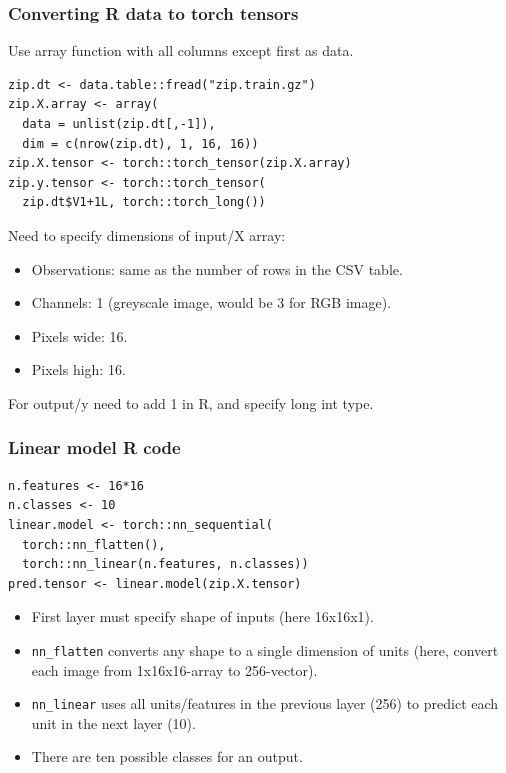 \documentclass{beamer}
\begin{document}
\begin{frame}[fragile]
  \frametitle{Converting R data to torch tensors}
Use array function with all columns except first as data.  
\begin{verbatim}
zip.dt <- data.table::fread("zip.train.gz")
zip.X.array <- array(
  data = unlist(zip.dt[,-1]),
  dim = c(nrow(zip.dt), 1, 16, 16))
zip.X.tensor <- torch::torch_tensor(zip.X.array)
zip.y.tensor <- torch::torch_tensor(
  zip.dt$V1+1L, torch::torch_long())
\end{verbatim}
Need to specify dimensions of input/X array:
\begin{itemize}
\item Observations: same as the number of rows in the CSV table.
\item Channels: 1 (greyscale image, would be 3 for RGB image).
\item Pixels wide: 16.
\item Pixels high: 16.
\end{itemize}

For output/y need to add 1 in R, and specify long int type.

\end{frame}

\begin{frame}[fragile]
  \frametitle{Linear model R code}

\begin{verbatim}
n.features <- 16*16
n.classes <- 10
linear.model <- torch::nn_sequential(
  torch::nn_flatten(),
  torch::nn_linear(n.features, n.classes))
pred.tensor <- linear.model(zip.X.tensor)
\end{verbatim}

  \begin{itemize}
  \item First layer must specify shape of inputs (here 16x16x1).
  \item \texttt{nn\_flatten} converts any shape to a single dimension
    of units (here, convert each image from 1x16x16-array to 256-vector).
  \item \texttt{nn\_linear} uses all units/features in the previous
    layer (256) to predict each unit in the next layer (10).
  \item There are ten possible classes for an output.
  \end{itemize}

\end{frame}
\end{document}
